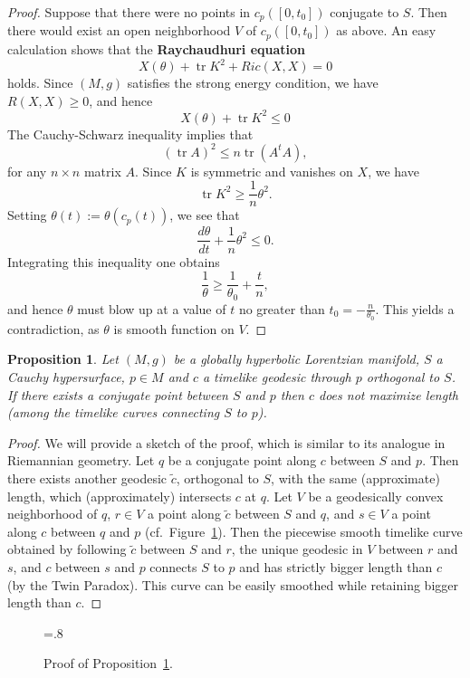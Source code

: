 \documentclass[10pt]{amsart}
\newcommand{\tr}{\operatorname{tr}}
\newtheorem{Prop}[Thm]{Proposition}
\theoremstyle{definition}
\theoremstyle{remark}
\begin{document}
\begin{proof}
Suppose that there were no points in $c_p([0,t_0])$ conjugate to $S$. Then there would exist an open neighborhood $V$ of $c_p([0,t_0])$ as above. An easy calculation shows that the {\bf Raychaudhuri equation}
\[
X(\theta) + \tr K^2 + Ric(X,X) = 0
\]
holds. Since $(M,g)$ satisfies the strong energy condition, we have $R(X,X) \geq 0$, and hence
\[
X(\theta) + \tr K^2 \leq 0
\]
The Cauchy-Schwarz inequality implies that
\[
(\tr A)^2 \leq n \tr(A^tA),
\]
for any $n \times n$ matrix $A$. Since $K$ is symmetric and vanishes on $X$, we have
\[
\tr K^2 \geq \frac1n \theta^2.
\]
Setting $\theta(t):=\theta(c_p(t))$, we see that
\[
\frac{d \theta}{d t} + \frac1n \theta^2 \leq 0.
\] 
Integrating this inequality one obtains
\[
\frac1{\theta} \geq \frac1{\theta_0} + \frac{t}n,
\]
and hence $\theta$ must blow up at a value of $t$ no greater than $t_0=-\frac{n}{\theta_0}$. This yields a contradiction, as $\theta$ is smooth function on $V$.
\end{proof}

\begin{Prop} \label{conjugate_prop}
Let $(M,g)$ be a globally hyperbolic Lorentzian manifold, $S$ a Cauchy hypersurface, $p \in M$ and $c$ a timelike geodesic through $p$ orthogonal to $S$. If there exists a conjugate point between $S$ and $p$ then $c$ does not maximize length (among the timelike curves connecting $S$ to $p$).
\end{Prop}

\begin{proof}
We will provide a sketch of the proof, which is similar to its analogue in Riemannian geometry. Let $q$ be a conjugate point along $c$ between $S$ and $p$. Then there exists another geodesic $\tilde{c}$, orthogonal to $S$, with the same (approximate) length, which (approximately) intersects $c$ at $q$. Let $V$ be a geodesically convex neighborhood of $q$, $r\in V$ a point along $\tilde{c}$ between $S$ and $q$, and $s\in V$ a point along $c$ between $q$ and $p$ (cf.~Figure~\ref{Figure_conj}). Then the piecewise smooth timelike curve obtained by following $\tilde{c}$ between $S$ and $r$, the unique geodesic in $V$ between $r$ and $s$, and $c$ between $s$ and $p$ connects $S$ to $p$ and has strictly bigger length than $c$ (by the Twin Paradox). This curve can be easily smoothed while retaining bigger length than $c$.
\end{proof}

\begin{figure}[h!]
\begin{center}
\epsfxsize=.8\textwidth
\leavevmode
{}
\end{center}
\caption{Proof of Proposition~\ref{conjugate_prop}.} \label{Figure_conj}
\end{figure}
\end{document}
